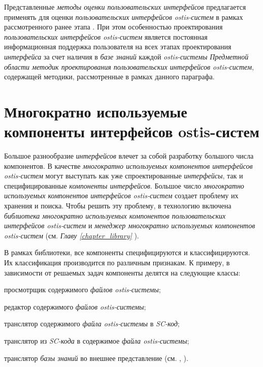 {Представленные \textit{методы оценки пользовательских интерфейсов} предлагается применять для оценки \textit{пользовательских интерфейсов ostis-систем} в рамках рассмотренного ранее этапа . При этом особенностью проектирования \textit{пользовательских интерфейсов ostis-систем} является постоянная информационная поддержка пользователя на всех этапах проектирования \textit{интерфейса} за счет наличия в \textit{базе знаний} каждой \textit{ostis-системы} \textit{Предметной области методик проектирования пользовательских интерфейсов ostis-систем}, содержащей методики, рассмотренные в рамках данного параграфа.


\section{Многократно используемые компоненты интерфейсов ostis-систем}
\label{sec_reusable_UI_components}

Большое разнообразие \textit{интерфейсов} влечет за собой разработку большого числа компонентов. В качестве \textit{многократно используемых компонентов интерфейсов ostis-систем} могут выступать как уже спроектированные
\textit{интерфейсы}, так и специфицированные \textit{компоненты интерфейсов}. Большое число \textit{многократно используемых компонентов интерфейсов ostis-систем} создает проблему их хранения и поиска. Чтобы решить эту проблему, в технологию включена \textit{библиотека многократно используемых компонентов пользовательских интерфейсов ostis-систем} и \textit{менеджер многократно используемых компонентов ostis-систем} (см. \textit{Главу \ref{chapter_library} }).

В рамках библиотеки, все компоненты специфицируются и классифицируются. Их классификация производится по различным признакам. К примеру, в зависимости от решаемых задач компоненты делятся на следующие классы:

\begin{textitemize}
	\item просмотрщик содержимого \textit{файлов ostis-системы};
	\item редактор содержимого \textit{файлов ostis-системы};
	\item транслятор содержимого \textit{файла ostis-системы} в \textit{SC-код};
	\item транслятор из \textit{SC-кода} в содержимое \textit{файла ostis-системы};
	\item транслятор \textit{базы знаний} во внешнее представление (см. , ).
\end{textitemize}

}
